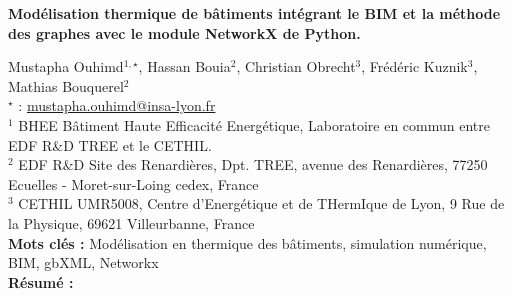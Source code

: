 


    \newpage


%
\begin{flushleft}
\addtocounter{section}{1}
{\Large \textbf{Modélisation thermique de bâtiments intégrant le BIM et la méthode des graphes avec le module NetworkX de Python.}}\label{ref:58}
\end{flushleft}
%
Mustapha Ouhimd$^{1,\star}$, Hassan Bouia$^{2}$, Christian Obrecht$^{3}$, Frédéric Kuznik$^{3}$, Mathias Bouquerel$^{2}$\\[2mm]
$^{\star}$ \Letter : \url{mustapha.ouhimd@insa-lyon.fr}\\[2mm]
{\footnotesize $^{1}$ BHEE Bâtiment Haute Efficacité Energétique, Laboratoire en commun entre EDF R\&D TREE et le CETHIL.}\\
{\footnotesize $^{2}$ EDF R\&D Site des Renardières, Dpt. TREE, avenue des Renardières, 77250 Ecuelles - Moret-sur-Loing cedex, France}\\
{\footnotesize $^{3}$ CETHIL UMR5008, Centre d'Energétique et de THermIque de Lyon, 9 Rue de la Physique, 69621 Villeurbanne, France}\\
[4mm]
%
\noindent \textbf{Mots clés : } Modélisation en thermique des bâtiments, simulation numérique, BIM, gbXML, Networkx\\[4mm]
%
\noindent \textbf{Résumé : } 

